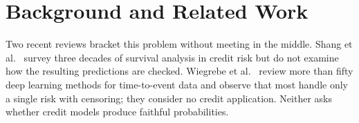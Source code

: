 \documentclass[11pt,journal]{IEEEtran}
\begin{document}
\section{Background and Related Work}
Two recent reviews bracket this problem without meeting in the middle.
Shang et al.~\cite{shang2024survival} survey three decades of survival analysis in
credit risk but do not examine how the resulting predictions are checked.
Wiegrebe et al.~\cite{wiegrebe2024deep} review more than fifty deep learning methods
for time-to-event data and observe that most handle only a single risk with
censoring; they consider no credit application. Neither asks whether credit
models produce faithful probabilities.
\end{document}
